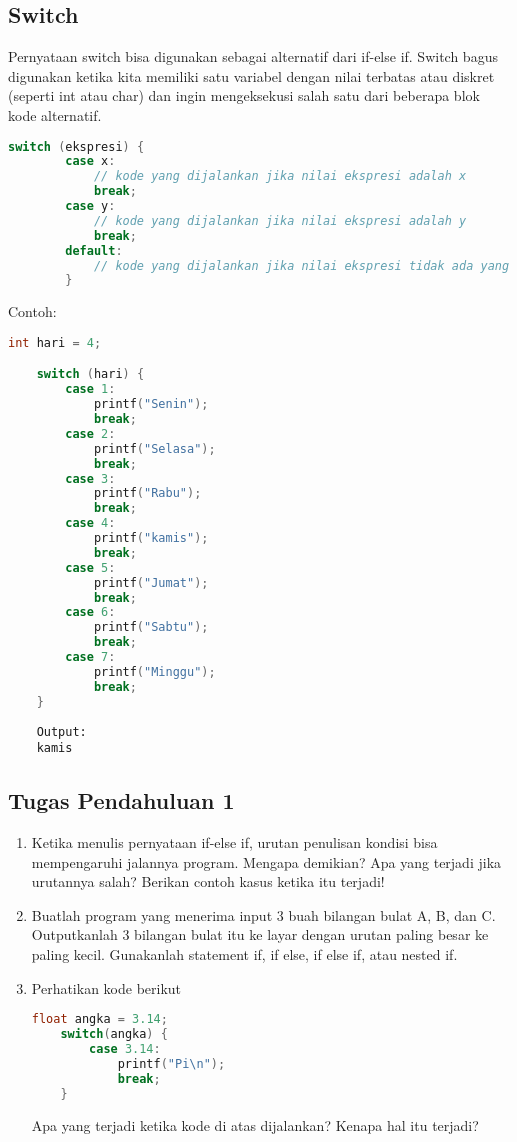 \subsection{Switch}
Pernyataan switch bisa digunakan sebagai alternatif dari if-else if.
Switch bagus digunakan ketika kita memiliki satu variabel dengan nilai terbatas atau diskret (seperti int atau char) 
dan ingin mengeksekusi salah satu dari beberapa blok kode alternatif.
{
\captionsetup[lstlisting]{labelformat=empty, justification=raggedright, singlelinecheck=false} %
\begin{lstlisting}[language=c, caption={syntax}]
	switch (ekspresi) {
		case x:
			// kode yang dijalankan jika nilai ekspresi adalah x
			break;
		case y:
			// kode yang dijalankan jika nilai ekspresi adalah y
			break;
		default:
			// kode yang dijalankan jika nilai ekspresi tidak ada yang sama dengan setiap case di atas
		}
\end{lstlisting}
}
Contoh:
\begin{lstlisting}[language=c]
	int hari = 4;

    switch (hari) {
		case 1:
			printf("Senin");
			break;
		case 2:
			printf("Selasa");
			break;
		case 3:
			printf("Rabu");
			break;
		case 4:
			printf("kamis");
			break;
		case 5:
			printf("Jumat");
			break;
		case 6:
			printf("Sabtu");
			break;
		case 7:
			printf("Minggu");
			break;
    }
\end{lstlisting}
\begin{verbatim}
	Output:
	kamis
\end{verbatim}

\subsection*{Tugas Pendahuluan 1}
\begin{enumerate}
	\item Ketika menulis pernyataan if-else if, urutan penulisan kondisi bisa mempengaruhi jalannya program.
	Mengapa demikian? Apa yang terjadi jika urutannya salah? Berikan contoh kasus ketika itu terjadi!
	\item Buatlah program yang menerima input 3 buah bilangan bulat A, B, dan C.
	Outputkanlah 3 bilangan bulat itu ke layar dengan urutan paling besar ke paling kecil. 
	Gunakanlah statement if, if else, if else if, atau nested if.
	\item Perhatikan kode berikut
	\begin{lstlisting}[language=c]
	float angka = 3.14;
	switch(angka) {
		case 3.14:
			printf("Pi\n");
			break;
	}
\end{lstlisting}
	Apa yang terjadi ketika kode di atas dijalankan?
	Kenapa hal itu terjadi?
\end{enumerate}

